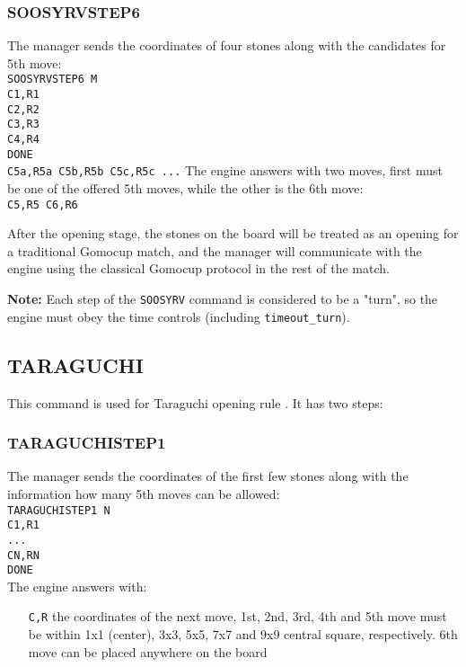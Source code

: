 \documentclass[12pt,a4paper]{article}
\begin{document}
\subsubsection{SOOSYRVSTEP6}
The manager sends the coordinates of four stones along with the candidates for 5th move:\\
\texttt{SOOSYRVSTEP6 M}\\
\texttt{C1,R1}\\
\texttt{C2,R2}\\
\texttt{C3,R3}\\
\texttt{C4,R4}\\
\texttt{DONE}\\
\texttt{C5a,R5a C5b,R5b C5c,R5c ...}
The engine answers with two moves, first must be one of the offered 5th moves, while the other is the 6th move:\\
\texttt{C5,R5 C6,R6}

After the opening stage, the stones on the board will be treated as an opening for a traditional Gomocup match, and the manager will communicate with the engine using the classical Gomocup protocol in the rest of the match.

\textbf{Note:} Each step of the \texttt{SOOSYRV} command is considered to be a "turn", so the engine must obey the time controls (including \texttt{timeout{\_}turn}).


\subsection{TARAGUCHI}
\label{cmd_taraguchi}
This command is used for Taraguchi opening rule \cite{renju_opening_rules}. It has two steps:

\subsubsection{TARAGUCHISTEP1}
The manager sends the coordinates of the first few stones along with the information how many 5th moves can be allowed:\\
\texttt{TARAGUCHISTEP1 N}\\
\texttt{C1,R1}\\
\texttt{...}\\
\texttt{CN,RN}\\
\texttt{DONE}\\
The engine answers with:
\begin{enumerate}[leftmargin=7.5em]
\item[\texttt{C,R}]{the coordinates of the next move, 1st, 2nd, 3rd, 4th and 5th move must be within 1x1 (center), 3x3, 5x5, 7x7 and 9x9 central square, respectively. 6th move can be placed anywhere on the board}
\end{enumerate}
\end{document}
